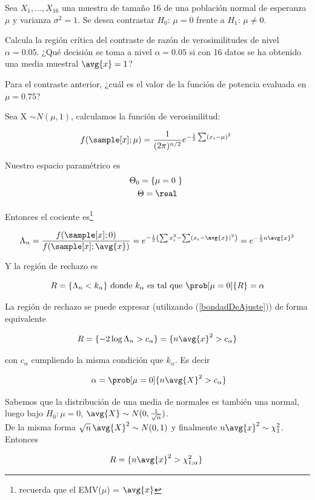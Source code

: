 \begin{problem}[5]
Sea $X_1,\dotsc, X_{16}$ una muestra de tamaño 16 de una población normal de esperanza $\mu$ y varianza $\sigma^2 = 1$. Se desea contrastar $H_0:\,\mu = 0$ frente a $H_1:\,\mu \neq 0$.

\ppart Calcula la región crítica del contraste de razón de verosimilitudes de nivel $\alpha = 0.05$. ¿Qué decisión se toma a nivel $\alpha = 0.05$ si con 16 datos se ha obtenido una media muestral $\avg{x} = 1$?

\ppart Para el contraste anterior, ¿cuál es el valor de la función de potencia evaluada en $\mu = 0.75$?
\solution

\spart
Sea X $\sim N(\mu, 1)$, calculamos la función de verosimilitud:

\[ f(\sample[x];\mu) = \frac{1}{(2\pi)^{n/2}} e^{-\frac{1}{2}\sum(x_i-\mu)^2} \]

Nuestro espacio paramétrico es 
\begin{gather*}
\Theta_0 = \{ \mu = 0 \} \\
\Theta = \real
\end{gather*}

Entonces el cociente es\footnote{recuerda que el EMV($\mu$) = $\avg{x}$}

\[
\Lambda_n =
\frac{f(\sample[x];0)}{f(\sample[x];\avg{x})} =
e^{-\frac{1}{2} \left(\sum x_i^2 - \sum(x_i - \avg{x})^2 \right)} = 
e^{-\frac{1}{2}n \avg{x}^2}
\]

Y la región de rechazo es

\[ R = \{ \Lambda_n < k_\alpha \} \text{ donde } k_\alpha \text{ es tal que } \prob[\mu = 0]{R} = \alpha \] 

La región de rechazo se puede expresar (utilizando (\ref{bondadDeAjuste})) de forma equivalente

\[ R=\{ -2\log \Lambda_n > c_\alpha\} = \{ n\avg{x}^2> c_\alpha \} \]

con $c_\alpha$ cumpliendo la misma condición que $k_\alpha$. Es decir

\[ \alpha = \prob[\mu=0]{n\avg{X}^2 > c_\alpha} \]

Sabemos que la distribución de una media de normales es también una normal, luego bajo $H_0: \mu = 0$, $\avg{X} \sim N(0,\frac{1}{\sqrt{n}})$.\\
De la misma forma $\sqrt{n} \, \avg{X}^2\sim N(0,1)$ y finalmente $n\avg{x}^2\sim \chi_1^2$. Entonces

\[ R = \{ n \avg{x}^2 > \chi_{1;\alpha}^2 \} \]


\end{problem}
